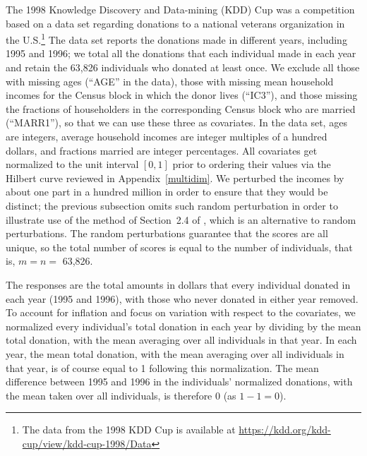 \documentclass[]{fairmeta}
\begin{document}
The 1998 Knowledge Discovery and Data-mining (KDD) Cup was a competition
based on a data set regarding donations to a national veterans organization
in the U.S.\footnote{The data from the 1998 KDD Cup is available
at \url{https://kdd.org/kdd-cup/view/kdd-cup-1998/Data}}
The data set reports the donations made in different years,
including 1995 and 1996; we total all the donations that each individual made
in each year and retain the 63,826 individuals who donated at least once.
We exclude all those with missing ages (``AGE'' in the data),
those with missing mean household incomes for the Census block
in which the donor lives (``IC3''), and those missing the fractions
of householders in the corresponding Census block who are married (``MARR1''),
so that we can use these three as covariates.
In the data set, ages are integers, average household incomes
are integer multiples of a hundred dollars, and fractions married
are integer percentages. All covariates get normalized to the unit interval
$[0, 1]$ prior to ordering their values via the Hilbert curve
reviewed in Appendix~\ref{multidim}.
We perturbed the incomes by about one part in a hundred million
in order to ensure that they would be distinct;
the previous subsection omits such random perturbation
in order to illustrate use of the method of Section~2.4 of \cite{tygert_pvals},
which is an alternative to random perturbations.
The random perturbations guarantee that the scores are all unique,
so the total number of scores is equal to the number of individuals, that is,
$m = n =$ 63,826.

The responses are the total amounts in dollars that every individual donated
in each year (1995 and 1996), with those who never donated in either year
removed. To account for inflation and focus on variation with respect
to the covariates, we normalized every individual's total donation in each year
by dividing by the mean total donation, with the mean averaging
over all individuals in that year. In each year, the mean total donation,
with the mean averaging over all individuals in that year,
is of course equal to 1 following this normalization.
The mean difference between 1995 and 1996
in the individuals' normalized donations,
with the mean taken over all individuals, is therefore 0 (as $1 - 1 = 0$).
\end{document}
